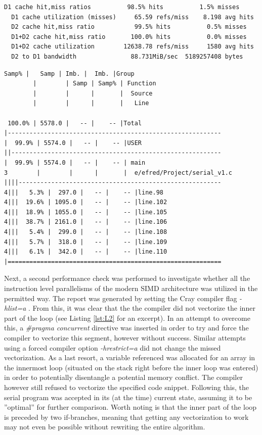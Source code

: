 \documentclass[12pt]{article}
\begin{document}
\begin{lstlisting}[caption=CrayPat/X report snippet, label={lst:L1}]
  D1 cache hit,miss ratios          98.5% hits          1.5% misses
  D1 cache utilization (misses)     65.59 refs/miss    8.198 avg hits
  D2 cache hit,miss ratio           99.5% hits          0.5% misses
  D1+D2 cache hit,miss ratio       100.0% hits          0.0% misses
  D1+D2 cache utilization        12638.78 refs/miss     1580 avg hits
  D2 to D1 bandwidth               88.731MiB/sec  5189257408 bytes
\end{lstlisting}

\begin{lstlisting}[caption=CrayPat/X report snippet, label={lst:L3}]
  Samp% |   Samp | Imb. |  Imb. |Group
        |        | Samp | Samp% | Function
        |        |      |       |  Source
        |        |      |       |   Line
    
 100.0% | 5578.0 |   -- |    -- |Total
|-----------------------------------------------------------
|  99.9% | 5574.0 |   -- |    -- |USER
||----------------------------------------------------------
|  99.9% | 5574.0 |   -- |    -- | main
3        |        |      |       |  e/efred/Project/serial_v1.c
||||--------------------------------------------------------
4|||   5.3% |  297.0 |   -- |    -- |line.98
4|||  19.6% | 1095.0 |   -- |    -- |line.102
4|||  18.9% | 1055.0 |   -- |    -- |line.105
4|||  38.7% | 2161.0 |   -- |    -- |line.106
4|||   5.4% |  299.0 |   -- |    -- |line.108
4|||   5.7% |  318.0 |   -- |    -- |line.109
4|||   6.1% |  342.0 |   -- |    -- |line.110
|===========================================================
\end{lstlisting}


Next, a second performance check was performed to investigate whether all the instruction level parallelisms of the modern SIMD architecture was utilized in the permitted way. The report was generated by setting the Cray compiler flag \emph{-hlist=a} . From this, it was clear that the the compiler did not vectorize the inner part of the loop (see Listing \ref{lst:L2} for an excerpt). In an attempt to overcome this, a \emph{\color{Plum} \#pragma concurrent} directive was inserted in order to try and force the compiler to vectorize this segment, however without success. Similar attempts using a forced compiler option \emph{-hrestrict=a} did not change the missed vectorization. As a last resort, a variable referenced was allocated for an array in the innermost loop (situated on the stack right before the inner loop was entered) in order to potentially disentangle a potential memory conflict. The compiler however still refused to vectorize the specified code snippet. Following this, the serial program was accepted in its (at the time) current state, assuming it to be ''optimal'' for further comparison. Worth noting is that the inner part of the loop is preceded by two if-branches, meaning that getting any vectorization to work may not even be possible without rewriting the entire algorithm.   
\end{document}

